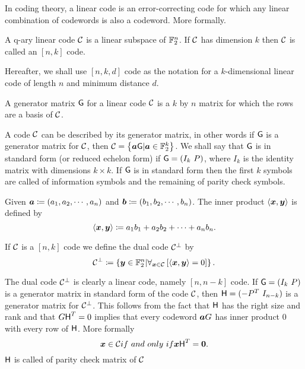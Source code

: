 In coding theory, a linear code is an error-correcting code for which any linear combination of codewords is also a codeword. More formally.

{
     A q-ary linear code $\mathcal{C}$ is a linear subspace of $\mathbb{F}_2^n$. If $\mathcal{C}$ has dimension $k$ then $\mathcal{C}$ is called an $[n,k]$ code.
}

Hereafter, we shall use $[n,k,d]$ code as the notation for a $k$-dimensional linear code of length $n$ and minimum distance $d$.

{
     A generator matrix $\normalfont\textsf{G}$ for a linear code $\mathcal{C}$ is a $k$ by $n$ matrix for which the rows are a basis of $\mathcal{C}$.
}

A code $\mathcal{C}$ can be described by its generator matrix, in other words if $\normalfont\textsf{G}$ is a generator matrix for $\mathcal{C}$, then $\mathcal{C} = \left\{\boldsymbol{a}\normalfont\textsf{G}|\boldsymbol{a}\in \mathbb{F}_2^k\right\}$. We shall say that $\normalfont\textsf{G}$ is in standard form (or reduced echelon form) if $\normalfont\textsf{G} = (I_k\,\,P)$, where $I_k$ is the identity matrix with dimensions $k\times k$. If $\normalfont\textsf{G}$ is in standard form then the first $k$ symbols are called of information symbols and the remaining of parity check symbols.

{
     Given $\boldsymbol{a}\coloneqq (a_1, a_2, \cdots, a_n)$ and $\boldsymbol{b}\coloneqq (b_1, b_2, \cdots, b_n)$. The inner product $\langle\boldsymbol{x},\boldsymbol{y}\rangle$ is defined by
    \[
        \langle\boldsymbol{x},\boldsymbol{y}\rangle \coloneqq a_1b_1 + a_2b_2 + \cdots + a_nb_n.
    \]
}

{
     If $\mathcal{C}$ is a $[n,k]$ code we define the dual code $\mathcal{C}^{\perp}$ by 
    \[
        \mathcal{C}^{\perp} \coloneqq \left\{\boldsymbol{y}\in \mathbb{F}_2^n | \forall _{\boldsymbol{x}\in \mathcal{C}}\left[\langle\boldsymbol{x},\boldsymbol{y}\rangle = 0\right]\right\}.
    \]
}

The dual code $\mathcal{C}^{\perp}$ is clearly a linear code, namely $\left[n,n-k\right]$ code. If $\normalfont\textsf{G}=(I_k\,\,P)$ is a generator matrix in standard form of the code $\mathcal{C}$, then $\normalfont\textsf{H} = (-P^{T}\,\,I_{n-k})$ is a generator matrix for $\mathcal{C}^{\perp}$. This follows from the fact that $\normalfont\textsf{H}$ has the right size and rank and that $G\normalfont\textsf{H}^T = 0$ implies that every codeword $\boldsymbol{a}G$ has inner product $0$ with every row of $\normalfont\textsf{H}$. More formally
\[
    \boldsymbol{x} \in \mathcal{C} if\ and\ only\ if \boldsymbol{x}\normalfont\textsf{H}^T = \boldsymbol{0}.
\]
$\normalfont\textsf{H}$ is called of parity check matrix of $\mathcal{C}$


